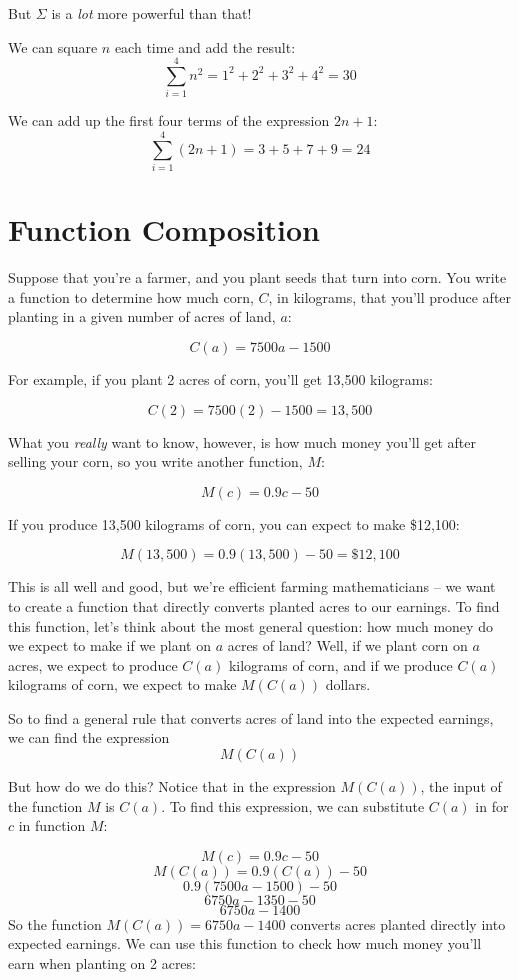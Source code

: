 \documentclass{article}
\begin{document}
But $\Sigma$ is a \textit{lot} more powerful than that!

We can square $n$ each time and add the result: 
$$\sum_{i=1}^{4} n^2 = 1^2 + 2^2 + 3^2 + 4^2 = 30$$

We can add up the first four terms of the expression $2n+1$:
$$\sum_{i=1}^{4} (2n+1) = 3 + 5 + 7 + 9 = 24$$

\section{Function Composition}
Suppose that you're a farmer, and you plant seeds that turn into corn. You write a function to determine how much corn, $C$, in kilograms, that you'll produce after planting in a given number of acres of land, $a$:

$$C(a) = 7500a - 1500$$

For example, if you plant 2 acres of corn, you'll get 13,500 kilograms: 

$$C(2) = 7500(2) - 1500 = 13,500$$ 

What you \emph{really} want to know, however, is how much money you'll get after selling your corn, so you write another function, $M$: 

$$M(c) = 0.9c - 50$$

If you produce 13,500 kilograms of corn, you can expect to make \$12,100: 

$$M(13,500) = 0.9(13,500) - 50 = \$12,100$$

This is all well and good, but we're efficient farming mathematicians -- we want to create a function that directly converts planted acres to our earnings. To find this function, let's think about the most general question: how much money do we expect to make if we plant on $a$ acres of land? Well, if we plant corn on $a$ acres, we expect to produce $C(a)$ kilograms of corn, and if we produce $C(a)$ kilograms of corn, we expect to make $M(C(a))$ dollars.

So to find a general rule that converts acres of land into the expected earnings, we can find the expression
$$M(C(a))$$

But how do we do this? Notice that in the expression $M(C(a))$, the input of the function $M$ is $C(a)$. To find this expression, we can substitute $C(a)$ in for $c$ in function $M$: 

$$M(c) = 0.9c - 50$$
$$M(C(a)) = 0.9(C(a)) - 50$$
$$0.9(7500a - 1500) - 50$$
$$6750a - 1350 - 50$$
$$6750a - 1400$$
So the function $M(C(a)) = 6750a - 1400$ converts acres planted directly into expected earnings. We can use this function to check how much money you'll earn when planting on 2 acres: 
\end{document}
